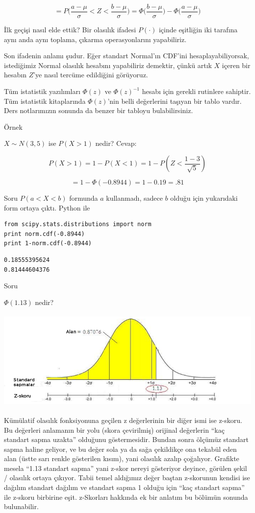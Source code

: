 \documentclass[12pt,fleqn]{article}\usepackage{../../common}
\begin{document}
$$
= P\bigg(\frac{a-\mu}{\sigma} < Z < \frac{b-\mu}{\sigma}\bigg) 
= 
\Phi\bigg(\frac{b-\mu}{\sigma}\bigg) - 
\Phi\bigg(\frac{a-\mu}{\sigma}\bigg) 
$$

İlk geçişi nasıl elde ettik? Bir olasılık ifadesi $P(\cdot)$ içinde eşitliğin iki
tarafına aynı anda aynı toplama, çıkarma operasyonlarını yapabiliriz. 

Son ifadenin anlamı şudur. Eğer standart Normal'ın CDF'ini
hesaplayabiliyorsak, istediğimiz Normal olasılık hesabını yapabiliriz
demektir, çünkü artık $X$ içeren bir hesabın $Z$'ye nasıl tercüme
edildiğini görüyoruz. 

Tüm istatistik yazılımları $\Phi(z)$ ve $\Phi(z)^{-1}$ hesabı için gerekli
rutinlere sahiptir. Tüm istatistik kitaplarında $\Phi(z)$'nin belli
değerlerini taşıyan bir tablo vardır. Ders notlarımızın sonunda da benzer
bir tabloyu bulabilirsiniz. 

Örnek 

$X \sim N(3,5)$ ise $P(X > 1)$ nedir? Cevap:

$$ 
P(X>1) = 1 - P(X < 1) = 1 - P( Z < \frac{ 1 - 3}{\sqrt{5 }}) 
 $$

$$ = 1 - \Phi(-0.8944) =  1 - 0.19 = .81 $$

Soru $P(a < X < b)$ formunda $a$ kullanmadı, sadece $b$ olduğu için
yukarıdaki form ortaya çıktı. Python ile

\begin{verbatim}
from scipy.stats.distributions import norm
print norm.cdf(-0.8944)
print 1-norm.cdf(-0.8944)
\end{verbatim}

\begin{verbatim}
0.18555395624
0.81444604376
\end{verbatim}

Soru

$\Phi(1.13)$ nedir? 

\includegraphics[height=5cm]{stat_intro_06.png}

Kümülatif olasılık fonksiyonuna geçilen z değerlerinin bir diğer ismi ise
z-skoru. Bu değerleri anlamanın bir yolu (skora çevirilmiş) orijinal
değerlerin ``kaç standart sapma uzakta'' olduğunu göstermesidir. Bundan
sonra ölçümüz standart sapma haline geliyor, ve bu değer sola ya da sağa
çekildikçe ona tekabül eden alan (üstte sarı renkle gösterilen kısım), yani
olasılık azalıp çoğalıyor. Grafikte mesela ``1.13 standart sapma'' yani
z-skor nereyi gösteriyor deyince, görülen şekil / olasılık ortaya
çıkıyor. Tabii temel aldığımız değer baştan z-skorunun kendisi ise dağılım
standart dağılım ve standart sapma 1 olduğu için ``kaç standart sapma'' ile
z-skoru birbirine eşit. z-Skorları hakkında ek bir anlatım bu bölümün
sonunda bulunabilir.
\end{document}
